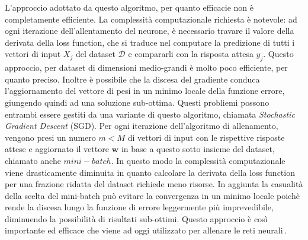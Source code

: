 % 
\noindent L'approccio adottato da questo algoritmo, per quanto efficacie non è completamente efficiente. La complessità computazionale richiesta è notevole: ad ogni iterazione dell'allentamento del neurone, è necessario travare il valore della derivata della loss function, che si traduce nel computare la predizione di tutti i vettori di input $X_j$ del dataset $\mathcal{D}$ e compararli con la risposta attesa $y_j$. Questo approccio, per dataset di dimensioni medio-grandi è molto poco efficiente, per quanto preciso. Inoltre è possibile che la discesa del gradiente conduca l'aggiornamento del vettore di pesi in un minimo locale della funzione errore, giungendo quindi ad una soluzione sub-ottima. Questi probliemi possono entrambi essere gestiti da una variante di questo algoritmo, chiamata \textit{Stochastic Gradient Descent} (\acs{SGD}). Per ogni iterazione dell'algoritmo di allenamento, vengono presi un numero $m < M$ di vettori di input con le rispettive risposte attese e aggiornato il vettore $\mathbf{w}$ in base a questo sotto insieme del dataset, chiamato anche $mini-batch$. In questo modo la complessità computazionale viene drasticamente diminuita in quanto calcolare la derivata della loss function per una frazione ridatta del dataset richiede meno risorse. In aggiunta la casualità della scelta del mini-batch può evitare la convergenza in un minimo locale poichè rende la discesa lungo la funzione di errore leggermente più imprevedibile, diminuendo la possibilità di risultati sub-ottimi. Questo approccio è così importante ed efficace che viene ad oggi utilizzato per allenare le reti neurali\,\cite{lu2022gradient, andrychowicz2016learning, nielsen2015neural}.

